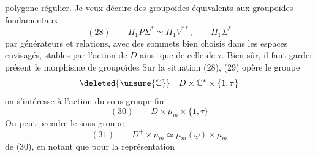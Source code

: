 polygone régulier. Je veux décrire des groupoïdes équivalents aux groupoïdes fondamentaux
\[
(28)\qquad\Pi_1P\Sigma^*\simeq\Pi_1V^{**},\qquad\Pi_1\Sigma^*
\]
par générateurs et relations, avec des sommets bien choisis dans les espaces envisagés, stables par l'action de $D$ ainsi que de celle de $\tau$. Bien sûr, il faut garder présent le morphisme de groupoïdes
Sur la situation (28), (29) opère le groupe
\[
\deleted{\unsure{\mathbb C}}\quad D\times\mathbb C^*\times\{1,\tau\}
\]
on s'intéresse à l'action du sous-groupe fini
\[
(30)\qquad D\times\mu_m\times\{1,\tau\}
\]
On peut  prendre le sous-groupe
\[
(31)\qquad D^+\times\mu_m\simeq\mu_m(\underline\omega)\times\mu_m
\]
de (30), en notant que pour la représentation

